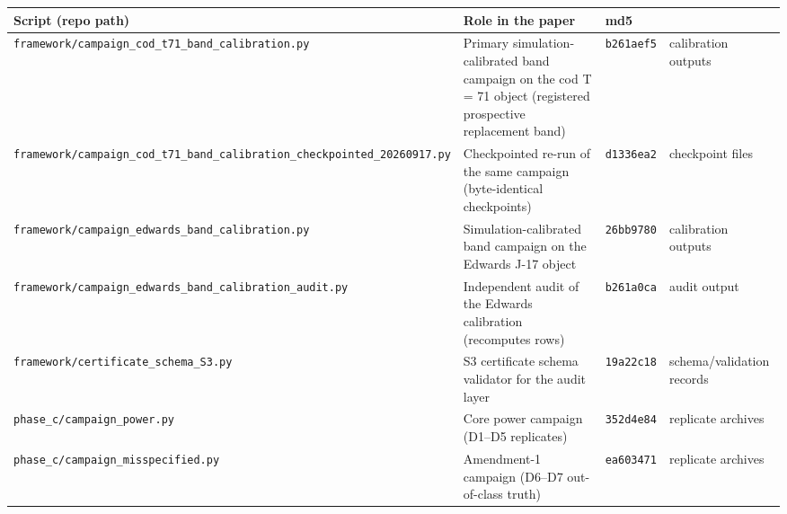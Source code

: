 \documentclass[11pt]{article}
\begin{document}
{\def\LTcaptype{none} %
\begin{longtable}[]{@{}
  >{\raggedright\arraybackslash}p{}
  >{\raggedright\arraybackslash}p{}
  >{\raggedright\arraybackslash}p{}
  >{\raggedright\arraybackslash}p{}@{}}
\toprule\noalign{}
\begin{minipage}[b]{\linewidth}\raggedright
Script (repo path)
\end{minipage} & \begin{minipage}[b]{\linewidth}\raggedright
Role in the paper
\end{minipage} & \begin{minipage}[b]{\linewidth}\raggedright
md5
\end{minipage} & \begin{minipage}[b]{\linewidth}\raggedright
\end{minipage} \\
\midrule\noalign{}
\endhead
\bottomrule\noalign{}
\endlastfoot
\texttt{framework/campaign\_cod\_t71\_band\_calibration.py} & Primary
simulation-calibrated band campaign on the cod T = 71 object (registered
prospective replacement band) & \texttt{b261aef5} & calibration
outputs \\
\texttt{framework/campaign\_cod\_t71\_band\_calibration\_checkpointed\_20260917.py}
& Checkpointed re-run of the same campaign (byte-identical checkpoints)
& \texttt{d1336ea2} & checkpoint files \\
\texttt{framework/campaign\_edwards\_band\_calibration.py} &
Simulation-calibrated band campaign on the Edwards J-17 object &
\texttt{26bb9780} & calibration outputs \\
\texttt{framework/campaign\_edwards\_band\_calibration\_audit.py} &
Independent audit of the Edwards calibration (recomputes rows) &
\texttt{b261a0ca} & audit output \\
\texttt{framework/certificate\_schema\_S3.py} & S3 certificate schema
validator for the audit layer & \texttt{19a22c18} & schema/validation
records \\
\texttt{phase\_c/campaign\_power.py} & Core power campaign (D1--D5
replicates) & \texttt{352d4e84} & replicate archives \\
\texttt{phase\_c/campaign\_misspecified.py} & Amendment-1 campaign
(D6--D7 out-of-class truth) & \texttt{ea603471} & replicate archives \\

\end{longtable}}
\end{document}
